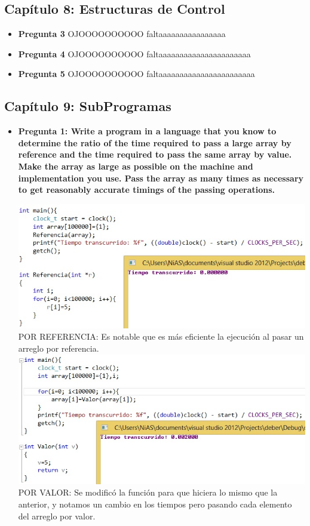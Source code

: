 \documentclass[12pt,oneside]{article}
\begin{document}
		\subsection{Capítulo 8: Estructuras de Control}	
			\begin{itemize}
				\item {\bf Pregunta 3}		
					OJOOOOOOOOOO faltaaaaaaaaaaaaaaaa
				\item {\bf Pregunta 4}
					OJOOOOOOOOOO faltaaaaaaaaaaaaaaaaaaaaaa
				\item {\bf Pregunta 5}
					OJOOOOOOOOOO faltaaaaaaaaaaaaaaaaaaaaaaa
			\end{itemize}

		\subsection{Capítulo 9: SubProgramas}      
			\begin{itemize}
				\item {\bf Pregunta 1: Write a program in a language that you know to determine the ratio of the time required to pass a large array by reference and the time required to pass the same array by value. Make the array as large as possible on the 						machine and implementation you use. Pass the array as many times as necessary to get reasonably accurate timings of the passing operations.}
					\begin{center}
						\includegraphics[scale=0.5]{Imagenes/7.jpg}\\
						POR REFERENCIA: Es notable que es más eficiente la ejecución al pasar un arreglo por referencia.\\
						\includegraphics[scale=0.5]{Imagenes/8.jpg}\\
						POR VALOR: Se modificó la función para que hiciera lo mismo que la anterior, y notamos un cambio en los tiempos pero pasando cada elemento del arreglo por valor.
					\end{center}
					
			\end{itemize}


\end{document}
